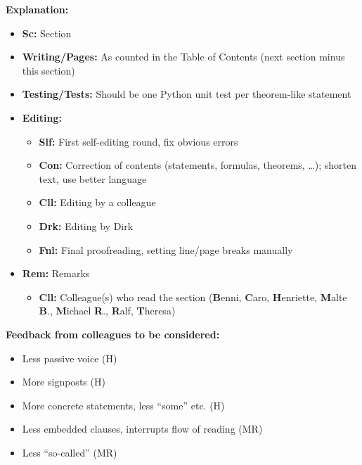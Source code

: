 \clearpage

\noindent
\textbf{Explanation:}

\begin{itemize}
  \item
  \textbf{Sc:}
  Section
  
  \item
  \textbf{Writing/Pages:}
  As counted in the Table of Contents
  (next section minus this section)
  
  \item
  \textbf{Testing/Tests:}
  Should be one Python unit test per theorem-like statement
  
  \item
  \textbf{Editing:}
  \begin{itemize}
    \item
    \textbf{Slf:}
    First self-editing round, fix obvious errors
    
    \item
    \textbf{Con:}
    Correction of contents (statements, formulas, theorems, \dots);
    shorten text, use better language
    
    \item
    \textbf{Cll:}
    Editing by a colleague
    
    \item
    \textbf{Drk:}
    Editing by Dirk
    
    \item
    \textbf{Fnl:}
    Final proofreading, setting line/page breaks manually
  \end{itemize}
  
  \item
  \textbf{Rem:}
  Remarks
  \begin{itemize}
    \item
    \textbf{Cll:}
    Colleague(s) who read the section
    (\textbf{B}enni,
    \textbf{C}aro,
    \textbf{H}enriette,
    \textbf{M}alte \textbf{B}.,
    \textbf{M}ichael \textbf{R}.,
    \textbf{R}alf,
    \textbf{T}heresa)
  \end{itemize}
\end{itemize}

\noindent
\textbf{Feedback from colleagues to be considered:}

\begin{itemize}
  \item
  Less passive voice (H)
  
  \item
  More signposts (H)
  
  \item
  More concrete statements, less ``some'' etc. (H)
  
  \item
  Less embedded clauses, interrupts flow of reading (MR)
  
  \item
  Less ``so-called'' (MR)
\end{itemize}

\cleardoublepage

